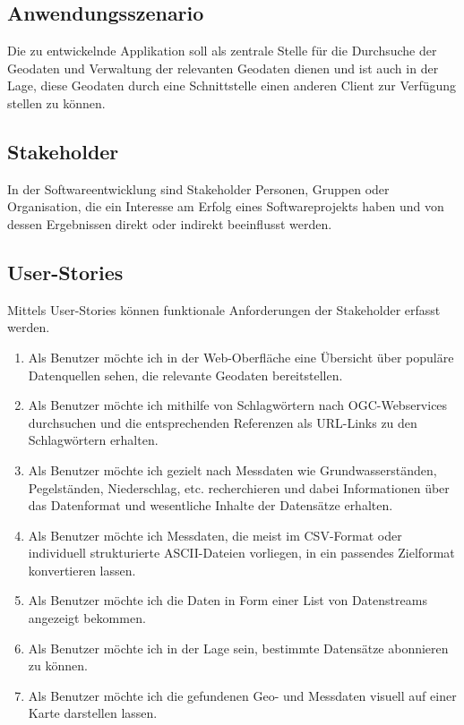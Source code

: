 \documentclass[a4paper,12pt]{scrreprt}
\begin{document}
	\subsection{Anwendungsszenario}
	Die zu entwickelnde Applikation soll als zentrale Stelle für die Durchsuche der Geodaten und Verwaltung der relevanten Geodaten dienen und ist auch in der Lage, diese Geodaten durch eine Schnittstelle einen anderen Client zur Verfügung stellen zu können.
	\subsection{Stakeholder}
	In der Softwareentwicklung sind Stakeholder Personen, Gruppen oder Organisation, die ein Interesse am Erfolg eines Softwareprojekts haben und von dessen Ergebnissen direkt oder indirekt beeinflusst werden.
	
	\subsection{User-Stories}
	Mittels User-Stories können funktionale Anforderungen der Stakeholder erfasst werden.
	\begin{enumerate}
		\item Als Benutzer möchte ich in der Web-Oberfläche eine Übersicht über populäre Datenquellen sehen, die  relevante Geodaten bereitstellen.
		\item Als Benutzer möchte ich mithilfe von Schlagwörtern nach OGC-Webservices durchsuchen und die entsprechenden Referenzen als URL-Links zu den Schlagwörtern erhalten.
		\item Als Benutzer möchte ich gezielt nach Messdaten wie Grundwasserständen, Pegelständen, Niederschlag, etc. recherchieren und dabei Informationen über das Datenformat und wesentliche Inhalte der Datensätze erhalten.
		\item Als Benutzer möchte ich Messdaten, die meist im CSV-Format oder individuell strukturierte ASCII-Dateien vorliegen, in ein passendes Zielformat konvertieren lassen.
		\item Als Benutzer möchte ich die Daten in Form einer List von Datenstreams angezeigt bekommen.
		\item Als Benutzer möchte ich in der Lage sein, bestimmte Datensätze abonnieren zu können.
		\item Als Benutzer möchte ich die gefundenen Geo- und Messdaten visuell auf einer Karte darstellen lassen.
	\end{enumerate}
	
\end{document}
